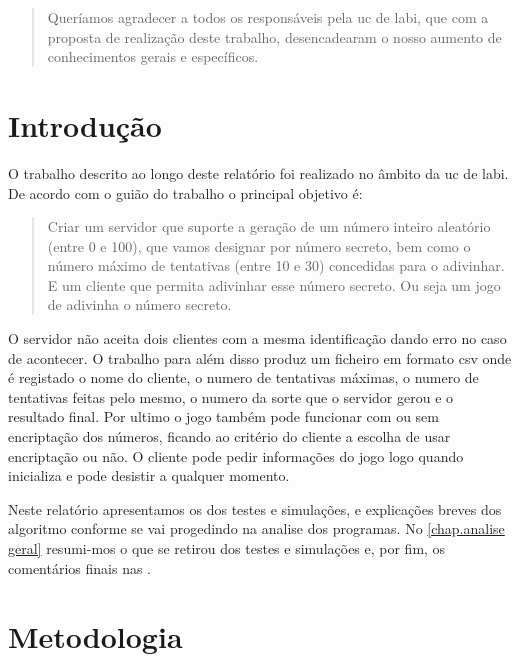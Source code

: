 \documentclass{report}
\theoremstyle{remark}
\begin{document}
\renewcommand{\abstractname}{Agradecimentos}
\begin{abstract}
Queríamos agradecer a todos os responsáveis pela \ac{uc} de \ac{labi}, que com a proposta de realização deste trabalho, desencadearam o nosso aumento de conhecimentos gerais e específicos.
\end{abstract}


\tableofcontents


\clearpage
{}

\chapter{Introdução}
\label{chap.introducao}

O trabalho descrito ao longo deste relatório foi realizado no âmbito da \ac{uc} de \ac{labi}. De acordo com o guião do trabalho \cite{AP2} o principal objetivo é:  \begin{quote} Criar um servidor que suporte a geração de um número inteiro
aleatório (entre 0 e 100), que vamos designar por número secreto, bem como o número
máximo de tentativas (entre 10 e 30) concedidas para o adivinhar. E um cliente que
permita adivinhar esse número secreto. Ou seja um jogo de adivinha o número secreto.
 \end{quote}
O servidor não aceita dois clientes com a mesma identificação dando erro no caso de acontecer.
O trabalho para além disso produz um ficheiro em formato \ac{csv} onde é registado o nome do cliente, o numero de tentativas máximas, o numero de tentativas feitas pelo mesmo, o numero da sorte que o servidor gerou e o resultado final. Por ultimo o jogo também pode funcionar com ou sem encriptação dos números, ficando ao critério do cliente a escolha de usar encriptação ou não. O cliente pode pedir informações do jogo logo quando inicializa e pode desistir a qualquer momento.

Neste relatório apresentamos os  dos testes e simulações, e explicações breves dos algoritmo conforme se vai progedindo na analise dos programas. No \autoref{chap.analise geral} resumi-mos o que se retirou dos testes e simulações e, por fim, os comentários finais nas .


\chapter{Metodologia}
\label{chap.metodologia}
\end{document}
